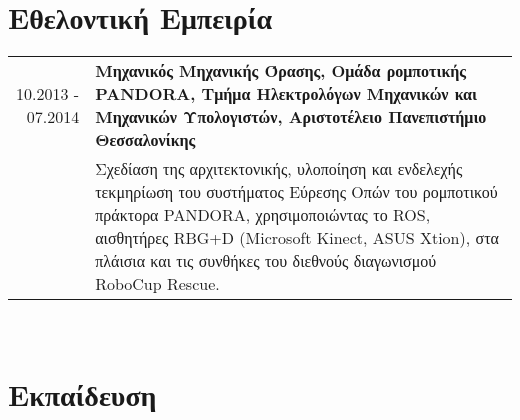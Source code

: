 \documentclass[a4paper,10pt,twoside]{article}
\begin{document}

\section{Εθελοντική Εμπειρία}

\begin{tabular}{rp{12cm}}
10.2013 - 07.2014 & \textbf{Μηχανικός Μηχανικής Όρασης, Ομάδα ρομποτικής PANDORA,
                    Τμήμα Ηλεκτρολόγων Μηχανικών και Μηχανικών Υπολογιστών, Αριστοτέλειο Πανεπιστήμιο Θεσσαλονίκης} \\
                  & Σχεδίαση της αρχιτεκτονικής, υλοποίηση και ενδελεχής τεκμηρίωση
                    του συστήματος Εύρεσης Οπών του ρομποτικού πράκτορα PANDORA, χρησιμοποιώντας το ROS, αισθητήρες RBG+D
                    (Microsoft Kinect, ASUS Xtion), στα πλάισια και τις συνθήκες του διεθνούς διαγωνισμού RoboCup Rescue.\\
\end{tabular} \\




\section{Εκπαίδευση}
\end{document}

